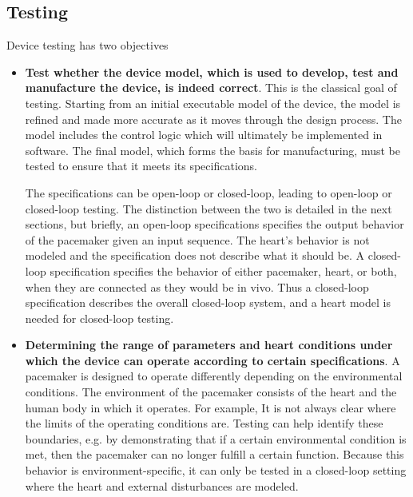 \subsection{Testing}
\label{testingObjectives}
Device testing has two objectives

\begin{itemize}
	\item \textbf{Test whether the device model, which is used to develop, test and manufacture the device, is indeed correct}.
	This is the classical goal of testing.
	Starting from an initial executable model of the device, the model is refined and made more accurate as it moves through the design process. 
	The model includes the control logic which will ultimately be implemented in software.
	The final model, which forms the basis for manufacturing, must be tested to ensure that it meets its specifications.
	
	The specifications can be open-loop or closed-loop, leading to open-loop or closed-loop testing.
	The distinction between the two is detailed in the next sections, but briefly, an open-loop specifications specifies the output behavior of the pacemaker given an input sequence.
	The heart's behavior is not modeled and the specification does not describe what it should be.
	A closed-loop specification specifies the behavior of either pacemaker, heart, or both, when they are connected as they would be in vivo.
	Thus a closed-loop specification describes the overall closed-loop system, and a heart model is needed for closed-loop testing.
	\item \textbf{Determining the range of parameters and heart conditions under which the device can operate according to certain specifications}.
	A pacemaker is designed to operate differently depending on the environmental conditions. 
	The environment of the pacemaker consists of the heart and the human body in which it operates. 
	For example, 
	It is not always clear where the limits of the operating conditions are.
	Testing can help identify these boundaries, e.g. by demonstrating that if a certain environmental condition is met, then the pacemaker can no longer fulfill a certain function.
	Because this behavior is environment-specific, it can only be tested in a closed-loop setting where the heart and external disturbances are modeled.
\end{itemize}